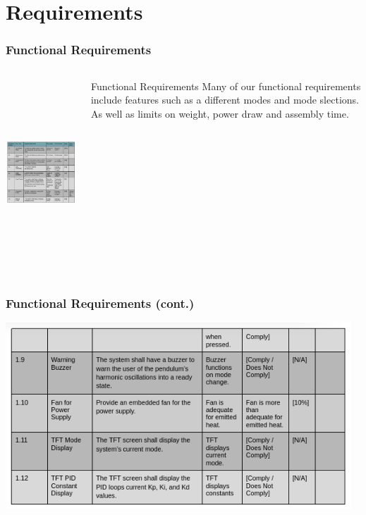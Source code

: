 \documentclass[aspectratio=169]{beamer}
\begin{document}
\section{Requirements}
\begin{frame}
    \frametitle{Functional Requirements}

    \begin{columns}
        \begin{column}{0.70\textwidth}
            \includegraphics[height=7cm]{Functional1}
        \end{column}

        \begin{column}{0.28\textwidth}
            \begin{block}{Functional Requirements}
                Many of our functional requirements include features such as
                a different modes and mode slections. As well as limits on
                weight, power draw and assembly time.
            \end{block}
        \end{column}
    \end{columns}

\end{frame}

\begin{frame}
    \frametitle{Functional Requirements (cont.)}

    \includegraphics[height=7cm]{Functional2}
\end{frame}
\end{document}
